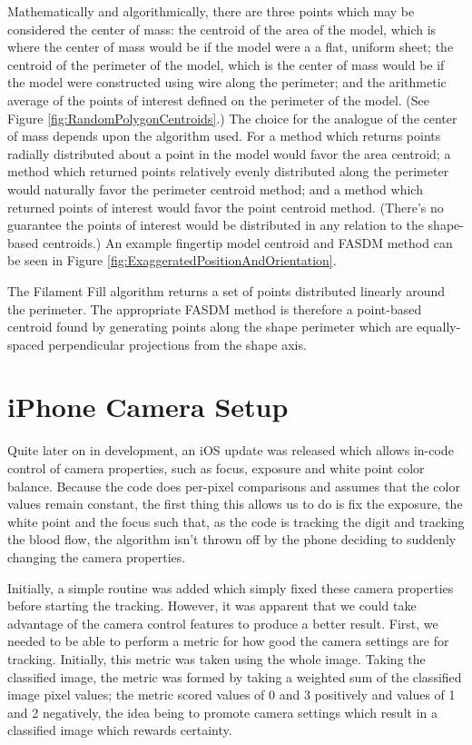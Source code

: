  Mathematically and algorithmically, there are three points which may be considered the center of mass: the centroid of the area of the model, which is where the center of mass would be if the model were a a flat, uniform sheet; the centroid of the perimeter of the model, which is the center of mass would be if the model were constructed using wire along the perimeter; and the arithmetic average of the points of interest defined on the perimeter of the model. (See Figure \ref{fig:RandomPolygonCentroids}.) The choice for the analogue of the center of mass depends upon the algorithm used. For a method which returns points radially distributed about a point in the model would favor the area centroid; a method which returned points relatively evenly distributed along the perimeter would naturally favor the perimeter centroid method; and a method which returned points of interest would favor the point centroid method. (There's no guarantee the points of interest would be distributed in any relation to the shape-based centroids.) An example fingertip model centroid and FASDM method can be seen in Figure \ref{fig:ExaggeratedPositionAndOrientation}.
 
 The Filament Fill algorithm returns a set of points distributed linearly around the perimeter. The appropriate FASDM method is therefore a point-based centroid found by generating points along the shape perimeter which are equally-spaced perpendicular projections from the shape axis.

\chapter{iPhone Camera Setup}\label{sec:iPhoneCameraSetup}
Quite later on in development, an iOS update was released which allows in-code control of camera properties, such as focus, exposure and white point color balance. Because the code does per-pixel comparisons and assumes that the color values remain constant, the first thing this allows us to do is fix the exposure, the white point and the focus such that, as the code is tracking the digit and tracking the blood flow, the algorithm isn't thrown off by the phone deciding to suddenly changing the camera properties. 

Initially, a simple routine was added which simply fixed these camera properties before starting the tracking. However, it was apparent that we could take advantage of the camera control features to produce a better result. First, we needed to be able to perform a metric for how good the camera settings are for tracking. Initially, this metric was taken using the whole image. Taking the classified image, the metric was formed by taking a weighted sum of the classified image pixel values; the metric scored values of 0 and 3 positively and values of 1 and 2 negatively, the idea being to promote camera settings which result in a classified image which rewards certainty.

